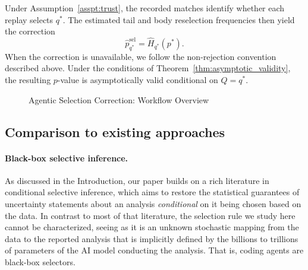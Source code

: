 \documentclass[10pt]{article}
\begin{document}
Under Assumption~\ref{asspt:trust}, the recorded matches identify whether each replay selects $q^*$. The estimated tail and body reselection frequencies then yield the correction
\[
\widehat p_{q^*}^{\mathrm{sel}}
=
\widehat H_{q^*}(p^*).
\]
When the correction is unavailable, we follow the non-rejection convention described above.
Under the conditions of Theorem~\ref{thm:asymptotic_validity}, the resulting $p$-value is asymptotically valid conditional on $Q=q^*$.

\begin{figure}[htb!]
\centering

\centering
\caption{Agentic Selection Correction: Workflow Overview}
\label{fig:workflow}
\end{figure}

\subsection{Comparison to existing approaches} \label{sec:comparison}

\paragraph{Black-box selective inference.} As discussed in the Introduction, our paper builds on a rich literature in conditional selective inference, which aims to restore the statistical guarantees of uncertainty statements about an analysis \textit{conditional} on it being chosen based on the data. In contrast to most of that literature, the selection rule we study here cannot be characterized, seeing as it is an unknown stochastic mapping from the data to the reported analysis that is implicitly defined by the billions to trillions of parameters of the AI model conducting the analysis. That is, coding agents are black-box selectors.
\end{document}
